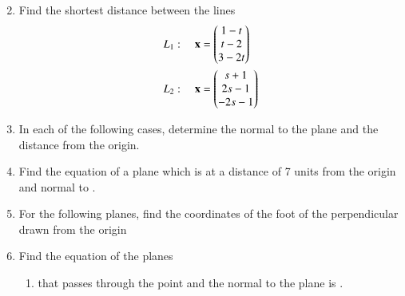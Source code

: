 \begin{enumerate}[label=\arabic*.,ref=\thesubsection.\theenumi]
\begin{align}
\end{align}
%
\item Find the shortest distance between the lines 
\begin{align}
L_1: \quad \mathbf{x} &= \begin{pmatrix}1-t\\t-2\\3-2t\end{pmatrix} 
\\
L_2: \quad \mathbf{x} &= \begin{pmatrix}s+1\\2s-1\\-2s-1\end{pmatrix}
\end{align}
\item In each of the following cases, determine the normal to the plane and the distance from the origin.
\begin{enumerate}[itemsep=2pt]
\end{enumerate}
\item Find the equation of a plane which is at a distance of 7 units from the origin and normal to .
%
\item  For the following planes, find the coordinates of the foot of the perpendicular drawn from the origin
\begin{enumerate}[itemsep=2pt]
\end{enumerate}
\item Find the equation of the planes
\begin{enumerate}
\item that passes through the point  and the normal to the plane is .

\end{enumerate}
\end{enumerate}
